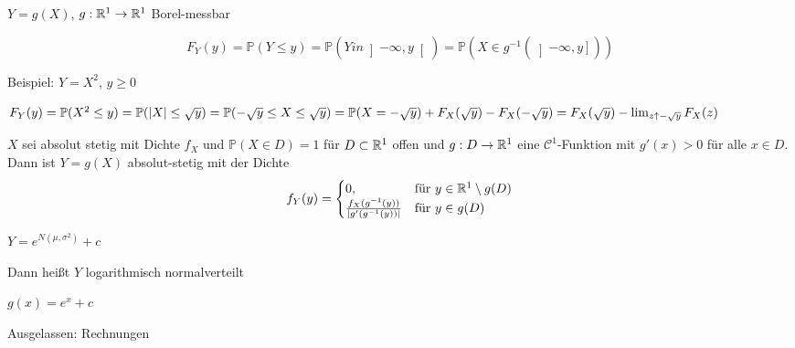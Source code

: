\documentclass{cheat-sheet}
\renewcommand{\P}{\mathbb{P}} %
\begin{document}


$Y = g(X)$, $g : \mathbb{R}^1 \to \mathbb{R}^1$ Borel-messbar

\[ F_Y(y) = \P(Y \leq y) = \P(Y in \left] -\infty, y \right[) = \P(X \in g^{-1}(\left] -\infty, y \right])) \]

Beispiel: $Y = X^2$, $y \geq 0$

$F_Y(y) = \P(X^2 \leq y) = \P(\abs{X} \leq \sqrt{y}) = \P(-\sqrt{y} \leq X \leq \sqrt{y}) = \P(X = -\sqrt{y}) + F_X(\sqrt{y}) - F_X(-\sqrt{y}) = F_X(\sqrt{y}) - \lim_{z \uparrow -\sqrt{y}} F_X(z)$

\begin{satz}
  $X$ sei absolut stetig mit Dichte $f_X$ und $\P(X \in D) = 1$ für $D \subset \mathbb{R}^1$ offen und $g : D \to \mathbb{R}^1$ eine $\mathcal{C}^1$-Funktion mit $g'(x) > 0$ für alle $x \in D$. Dann ist $Y = g(X)$ absolut-stetig mit der Dichte
  \[ f_Y(y) = \begin{cases} 0, & \text{für } y \in \mathbb{R}^1 \setminus g(D) \\ \frac{f_X(g^{-1}(y))}{\lvert g'(g^{-1}(y))\rvert} & \text{für } y \in g(D) \end{cases} \]
\end{satz}

\begin{bsp}
  $Y = e^{N (\mu, \sigma^2)} + c$

  Dann heißt $Y$ logarithmisch normalverteilt

  $g(x) = e^x + c$

  Ausgelassen: Rechnungen
\end{bsp}
\end{document}
